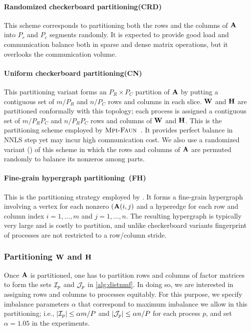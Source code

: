 \paragraph{Randomized checkerboard partitioning(\textbf{CRD})}
This scheme corresponds to partitioning both the rows and the columns of $\mathbf{A}$ into $P_r$ and $P_c$ segments randomly.
It is expected to provide good load and communication balance both in sparse and dense matrix operations, but it overlooks the communication volume.

\paragraph{Uniform checkerboard partitioning(\textbf{CN})}
This partitioning variant forms an $P_R \times P_C$ partition of $\mathbf{A}$ by putting a contiguous set of $m / P_R$ and $n / P_C$ rows and columns in each slice.
$\mathbf{W}$ and $\mathbf{H}$ are partitioned conformally with this topology; each process is assigned a contiguous set of  $m / P_R P_C$ and $n / P_R P_C$ rows and columns of $\mathbf{W}$ and $\mathbf{H}$.
This is the partitioning scheme employed by $\textsc{Mpi-Faun}$~\cite{KBP16, KBP16MPIFAUN}.
It provides perfect balance in NNLS step yet may incur high communication cost.
We also use a randomized variant (\urp) of this scheme in which the rows and columns of $\mathbf{A}$ are permuted randomly to balance its nonzeros among parts.

\paragraph{Fine-grain hypergraph partitioning~(\textbf{FH})}
This is the partitioning strategy employed by \hypertensor.
It forms a fine-grain hypergraph involving a vertex for each nonzero $(\mathbf{A}(i, j)$ and a hyperedge for each row and column index $i = 1, \dots, m$ and $j = 1, \dots, n$.
The resulting hypergraph is typically very large and is costly to partition, and unlike checkerboard variants fingerprint of processes are not restricted to a row/column stride.


\subsubsection{Partitioning $\mathbf{W}$ and $\mathbf{H}$}
Once $\mathbf{A}$ is partitioned, one has to partition rows and columns of factor matrices to form the sets $\mathcal{I}_p$ and $\mathcal{J}_p$ in \cref{alg:distnmf}.
In doing so, we are interested in assigning rows and columns to processes equitably.
For this purpose, we specify imbalance parameters $\alpha$ that correspond to maximum imbalance we allow in this partitioning; i.e., $|\mathcal{I}_p| \le \alpha m / P$ and $|\mathcal{J}_p| \le \alpha n / P$ for each process $p$, and set $\alpha = 1.05$ in the experiments.


